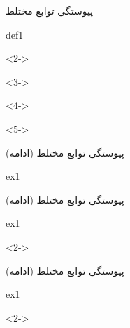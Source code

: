 \def\EMtitlesize{26}\def\EMtitleskip{31}
\begin{frame}{پیوستگی توابع مختلط}
\begin{EMbox}{def}{1}{}
\begin{uncoverenv}<2->
\end{uncoverenv}
\EMgap
\begin{uncoverenv}<3->
\end{uncoverenv}
\EMgap
\begin{uncoverenv}<4->
\end{uncoverenv}
\EMgap
\begin{uncoverenv}<5->
\end{uncoverenv}
\end{EMbox}
\end{frame}

\def\EMtitlesize{26}\def\EMtitleskip{31}
\begin{frame}{پیوستگی توابع مختلط (ادامه)}
\begin{EMbox}{ex}{1}{}
\end{EMbox}
\end{frame}

\def\EMtitlesize{26}\def\EMtitleskip{31}
\begin{frame}{پیوستگی توابع مختلط (ادامه)}
\begin{EMbox}{ex}{1}{}
\vspace{3bp}
\EMgap
\begin{uncoverenv}<2->
\end{uncoverenv}
\end{EMbox}
\end{frame}

\def\EMtitlesize{26}\def\EMtitleskip{31}
\begin{frame}{پیوستگی توابع مختلط (ادامه)}
\begin{EMbox}{ex}{1}{}
\vspace{3bp}
\EMgap
\begin{uncoverenv}<2->
\end{uncoverenv}
\end{EMbox}
\end{frame}

